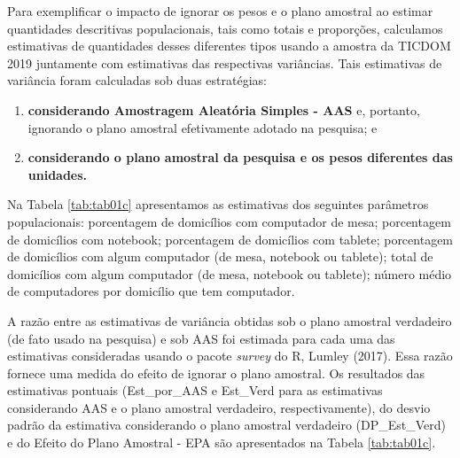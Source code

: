 \documentclass[
  12pt,
  brazilian,
]{book}
\theoremstyle{definition}
\theoremstyle{definition}
\theoremstyle{definition}
\theoremstyle{definition}
\theoremstyle{remark}
\begin{document}
Para exemplificar o impacto de ignorar os pesos e o plano amostral ao estimar quantidades descritivas populacionais, tais como totais e proporções, calculamos estimativas de quantidades desses diferentes tipos usando a amostra da TICDOM 2019 juntamente com estimativas das respectivas variâncias. Tais estimativas de variância foram calculadas sob duas estratégias:

\begin{enumerate}
\def\labelenumi{\alph{enumi})}
\item
  \textbf{considerando Amostragem Aleatória Simples - AAS} e, portanto, ignorando o plano amostral efetivamente adotado na pesquisa; e
\item
  \textbf{considerando o plano amostral da pesquisa e os pesos diferentes das unidades.}
\end{enumerate}

Na Tabela \ref{tab:tab01c} apresentamos as estimativas dos seguintes parâmetros populacionais: porcentagem de domicílios com computador de mesa; porcentagem de domicílios com notebook; porcentagem de domicílios com tablete; porcentagem de domicílios com algum computador (de mesa, notebook ou tablete); total de domicílios com algum computador (de mesa, notebook ou tablete); número médio de computadores por domicílio que tem computador.

A razão entre as estimativas de variância obtidas sob o plano amostral verdadeiro (de fato usado na pesquisa) e sob AAS foi estimada para cada uma das estimativas consideradas usando o pacote \emph{survey} do R, Lumley (2017). Essa razão fornece uma medida do efeito de ignorar o plano amostral. Os resultados das estimativas pontuais (Est\_por\_AAS e Est\_Verd para as estimativas considerando AAS e o plano amostral verdadeiro, respectivamente), do desvio padrão da estimativa considerando o plano amostral verdadeiro (DP\_Est\_Verd) e do Efeito do Plano Amostral - EPA são apresentados na Tabela \ref{tab:tab01c}.
\end{document}

